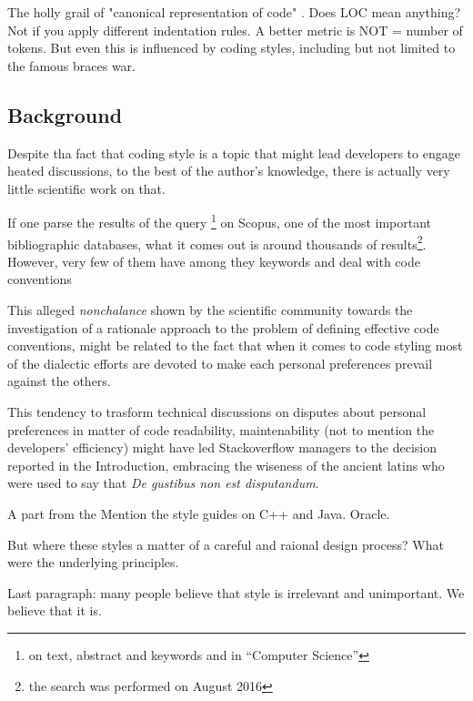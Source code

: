 The holly grail of "canonical representation of code" .
Does LOC mean anything?
Not if you apply different indentation rules.
A better metric is NOT = number of tokens.
But even this is influenced by coding styles, including but
not limited to the famous braces war.

\subsection{Background}

Despite tha fact that coding style is a topic that might lead developers to engage heated 
discussions, to the best of the author's knowledge, there is actually very little scientific 
work on that. 

If one parse the results of the query 
\footnote{on text, abstract and keywords and in ``Computer Science''} 
on Scopus, one of the most important bibliographic databases, what it comes out is around 
thousands of results\footnote{the search was performed on August 2016}. 
However, very few of them  have  among they
keywords and deal with code conventions

This alleged \emph{nonchalance} shown by the scientific community towards the investigation 
of a rationale approach to the problem of defining effective code conventions, might be 
related to the fact that when it comes to code styling most of the dialectic efforts are devoted
to make each personal preferences prevail against the others.

This tendency to trasform technical discussions on disputes about personal preferences 
in matter of code readability, maintenability (not to mention the developers' efficiency) might 
have led Stackoverflow managers to the decision reported in the Introduction, embracing the 
wiseness of the ancient latins who were used to say that \emph{De gustibus non est disputandum}.


A part from the Mention the style guides on C++ and Java. Oracle.

But where these styles a matter of a careful and raional design process?
What were the underlying principles.

Last paragraph: many people believe that style is irrelevant and unimportant.
We believe that it is.

